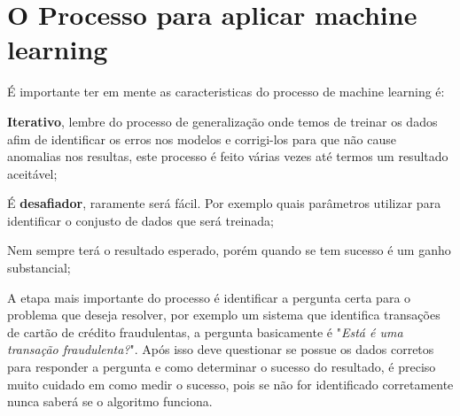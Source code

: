 \section{O Processo para aplicar machine learning}
\label{sec:howtoapplyml}

É importante ter em mente as caracteristicas do processo de machine learning é:
\begin{alineas}
    \item \textbf{Iterativo}, lembre do processo de generalização onde temos de treinar os dados afim de identificar os erros nos modelos e corrigi-los para que não cause
    anomalias nos resultas, este processo é feito várias vezes até termos um resultado aceitável;
    \item É  \textbf{desafiador}, raramente será fácil. Por exemplo quais parâmetros utilizar para identificar 
    o conjusto de dados que será treinada; 
    \item Nem sempre terá o resultado esperado, porém quando se tem sucesso é um ganho substancial;
\end{alineas}
  
A etapa mais importante do processo é identificar a pergunta certa para o problema que deseja resolver, por exemplo um sistema que identifica transações de cartão de crédito fraudulentas, a 
pergunta basicamente é "\textit{Está é uma transação fraudulenta?}". Após isso deve questionar se possue os dados corretos para responder a pergunta e como determinar o sucesso do resultado,
é preciso muito cuidado em como medir o sucesso, pois se não for identificado corretamente nunca saberá se o algoritmo funciona. 
